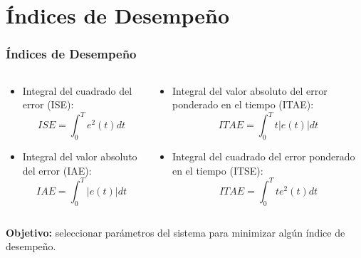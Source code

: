 \documentclass[aspectratio=169,handout]{beamer}
\theoremstyle{definition}
\theoremstyle{plain}
\theoremstyle{remark}
\begin{document}
\section{Índices de Desempeño}
\begin{frame}[<+->]\frametitle{Índices de Desempeño}
	\begin{columns}
	\begin{column}{0.5\textwidth}
	\begin{itemize}
		\item Integral del cuadrado del error (ISE):
		\begin{equation*}
			ISE = \int_0^T e^2(t) dt
		\end{equation*}
		\item Integral del valor absoluto del error (IAE):
		\begin{equation*}
			IAE = \int_0^T |e(t)| dt
		\end{equation*}
	\end{itemize}
	\end{column}	
	\begin{column}{0.5\textwidth}
	\begin{itemize}
		\item Integral del valor absoluto del error ponderado en el tiempo (ITAE):
		\begin{equation*}
			ITAE = \int_0^T t |e(t)| dt
		\end{equation*}
		\item Integral del cuadrado del error ponderado en el tiempo (ITSE):
		\begin{equation*}
			ITAE = \int_0^T t e^2(t) dt
		\end{equation*}
	\end{itemize}
	\end{column}	
	\end{columns}
	\vspace*{-5mm}
	\textbf{Objetivo:} seleccionar parámetros del sistema para minimizar algún índice de desempeño.
\end{frame}
\end{document}

